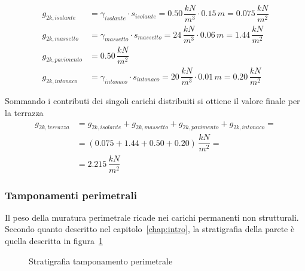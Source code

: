 \begin{align*}
 g_{2k, isolante} &= \gamma_{isolante}\cdot s_{isolante} = 0.50\,\dfrac{kN}{m^3}\cdot 0.15\,\si{m} = 0.075\,\dfrac{kN}{m^2}\\
 g_{2k, massetto} &= \gamma_{massetto}\cdot s_{massetto} = 24\,\dfrac{kN}{m^3}\cdot 0.06\,\si{m} = 1.44\,\dfrac{kN}{m^2}\\
 g_{2k, pavimento} &= 0.50\,\dfrac{kN}{m^2}\\
 g_{2k, intonaco} &= \gamma_{intonaco}\cdot s_{intonaco} = 20\,\dfrac{kN}{m^3}\cdot 0.01\,\si{m} = 0.20\,\dfrac{kN}{m^2}
\end{align*}

Sommando i contributi dei singoli carichi distribuiti si ottiene il valore finale per la terrazza
 \begin{align*}
	g_{2k, terrazza} &= g_{2k, isolante} + g_{2k, massetto} + g_{2k, pavimento} + g_{2k, intonaco} =\\ &= (0.075 + 1.44 + 0.50 + 0.20)\,\dfrac{kN}{m^2} =\\&=
	2.215\,\dfrac{kN}{m^2}
 \end{align*}

\subsubsection*{Tamponamenti perimetrali}
Il peso della muratura perimetrale ricade nei carichi permanenti non strutturali. Secondo quanto descritto nel capitolo~\ref{chap:intro}, la stratigrafia della parete è quella descritta in figura~\ref{fig:stratigrafiaTamponamento}

\begin{figure}
 \centering
 \caption{Stratigrafia tamponamento perimetrale}
 \label{fig:stratigrafiaTamponamento}
\end{figure}

